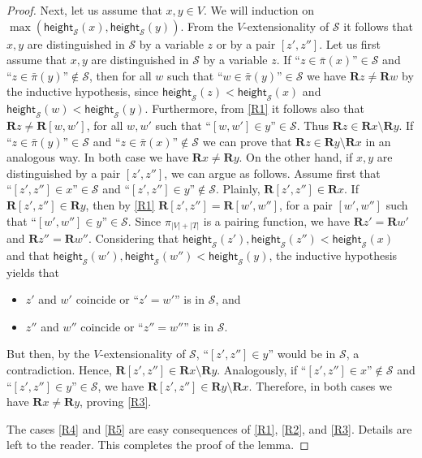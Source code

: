 \documentclass[a4paper,UKenglish]{lipics}
\newcommand{\nonpairs}[1]{\bar{\pi}(#1)}
\newcommand{\atset}{\mathcal{S}}
\newcommand{\vheight}{\mathsf{height}_{\atset}}
\newcommand{\aslit}[1]{\mbox{``}#1\mbox{''}}
\newcommand{\real}{\mathbf{R}}
\begin{document}
\begin{proof}
Next, let us assume that $x,y \in V$. We will induction on
$\max(\vheight(x), \vheight(y))$. From the $V$-extensionality of
$\atset$ it follows that $x,y$ are distinguished in $\atset$ by a
variable $z$ or by a pair $[z',z'']$.  Let us first assume that $x,y$
are distinguished in $\atset$ by a variable $z$.  If $\aslit{z \in
\nonpairs{x}} \in \atset$ and $\aslit{z \in \nonpairs{y}} \notin
\atset$, then for all $w$ such that $\aslit{w \in \nonpairs{y}} \in
\atset$ we have $\real z\neq \real w$ by the inductive hypothesis,
since $\vheight(z) < \vheight(x)$ and $\vheight(w)<\vheight(y)$.
Furthermore, from \ref{R1} it follows also that $\real z \neq \real
[w,w']$, for all $w,w'$ such that $\aslit{[w,w'] \in y} \in \atset$.
Thus $\real z \in \real x \setminus \real y$.  If $\aslit{z \in
\nonpairs{y}} \in \atset$ and $\aslit{z \in \nonpairs{x}} \notin
\atset$ we can prove that $\real z \in \real y \setminus \real x$ in
an analogous way. In both case we have $\real x \neq \real y$.
%
On the other hand, if $x,y$ are distinguished by a pair $[z',z'']$, we
can argue as follows.  Assume first that $\aslit{[z',z''] \in x} \in
\atset$ and $\aslit{[z',z''] \in y} \notin \atset$.  Plainly, $\real
[z',z''] \in \real x$.  If $\real [z',z''] \in \real y$, then by
\ref{R1} $\real [z',z''] = \real [w',w'']$, for a pair $[w',w'']$ such
that $\aslit{[w',w''] \in y} \in \atset$.  Since $\pi_{|V|+|T|}$ is a
pairing function, we have $\real z'=\real w'$ and $\real z''=\real
w''$. Considering that
$\vheight(z'),\vheight(z'') < \vheight(x)$ and that
$\vheight(w'),\vheight(w'')<\vheight(y)$,
the inductive
hypothesis yields that
\begin{itemize}
    \item $z'$ and $w'$ coincide or $\aslit{z' = w'}$ is in
    $\atset$, and

    \item $z''$ and $w''$ coincide or $\aslit{z'' = w''}$ is in
    $\atset$.
\end{itemize}
But then, by the $V$-extensionality of $\atset$, $\aslit{[z',z''] \in
y}$ would be in $\atset$, a contradiction.  Hence, $\real [z',z''] \in
\real x \setminus \real y$.  Analogously, if $\aslit{[z',z''] \in x}
\notin \atset$ and $\aslit{[z',z''] \in y} \in \atset$, we have $\real
[z',z''] \in \real y \setminus \real x$.  Therefore, in both cases we
have $\real x \neq \real y$, proving \ref{R3}.

The cases \ref{R4} and \ref{R5} are easy consequences of \ref{R1},
\ref{R2}, and \ref{R3}.  Details are left to the reader. This
completes the proof of the lemma.
\end{proof}
\end{document}
